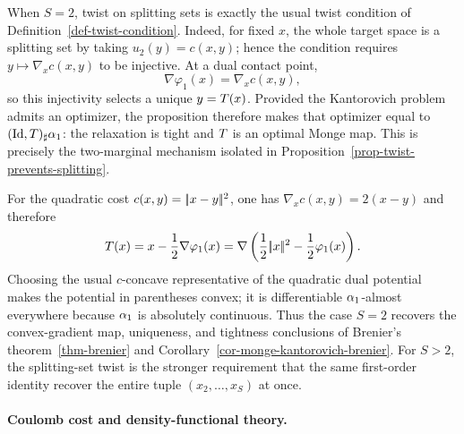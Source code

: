 \begin{rem}
	When $S=2$, twist on splitting sets is exactly the usual twist condition of Definition~\ref{def-twist-condition}. Indeed, for fixed $x$, the whole target space is a splitting set by taking $u_2(y)=c(x,y)$; hence the condition requires $y\mapsto\nabla_x c(x,y)$ to be injective. At a dual contact point,
	\[
		\nabla\varphi_1(x)=\nabla_x c(x,y),
	\]
	so this injectivity selects a unique $y=T(x)$. Provided the Kantorovich problem admits an optimizer, the proposition therefore makes that optimizer equal to $(\mathrm{Id},T)_\sharp\alpha_1$: the relaxation is tight and $T$ is an optimal Monge map. This is precisely the two-marginal mechanism isolated in Proposition~\ref{prop-twist-prevents-splitting}.

	For the quadratic cost $c(x,y)=|\!| x-y |\!|^2$, one has $\nabla_x c(x,y)=2(x-y)$ and therefore
	\[
		T(x)=x-\frac12\nabla\varphi_1(x)
		=\nabla\left(\frac12|\!| x |\!|^2-\frac12\varphi_1(x)\right).
	\]
	Choosing the usual $c$-concave representative of the quadratic dual potential makes the potential in parentheses convex; it is differentiable $\alpha_1$-almost everywhere because $\alpha_1$ is absolutely continuous. Thus the case $S=2$ recovers the convex-gradient map, uniqueness, and tightness conclusions of Brenier's theorem~\ref{thm-brenier} and Corollary~\ref{cor-monge-kantorovich-brenier}. For $S>2$, the splitting-set twist is the stronger requirement that the same first-order identity recover the entire tuple $(x_2,\ldots,x_S)$ at once.
\end{rem}

\paragraph{Coulomb cost and density-functional theory.}

